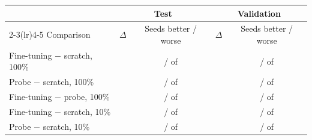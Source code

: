 \begin{tabular}{lcccc}
\toprule
 & \multicolumn{2}{c}{Test} & \multicolumn{2}{c}{Validation} \\
\cmidrule(lr){2-3}\cmidrule(lr){4-5}
Comparison & $\Delta$ & Seeds better / worse & $\Delta$ & Seeds better / worse \\
\midrule
Fine-tuning $-$ scratch, 100\% & \transferTestDiffMeanFinetuneVsScratchFOneZeroZero{} & \transferTestNBetterFinetuneVsScratchFOneZeroZero{} / \transferTestNWorseFinetuneVsScratchFOneZeroZero{} of \transferTestNComparedFinetuneVsScratchFOneZeroZero{} & \transferValDiffMeanFinetuneVsScratchFOneZeroZero{} & \transferValNBetterFinetuneVsScratchFOneZeroZero{} / \transferValNWorseFinetuneVsScratchFOneZeroZero{} of \transferValNComparedFinetuneVsScratchFOneZeroZero{} \\
Probe $-$ scratch, 100\% & \transferTestDiffMeanProbeVsScratchFOneZeroZero{} & \transferTestNBetterProbeVsScratchFOneZeroZero{} / \transferTestNWorseProbeVsScratchFOneZeroZero{} of \transferTestNComparedProbeVsScratchFOneZeroZero{} & \transferValDiffMeanProbeVsScratchFOneZeroZero{} & \transferValNBetterProbeVsScratchFOneZeroZero{} / \transferValNWorseProbeVsScratchFOneZeroZero{} of \transferValNComparedProbeVsScratchFOneZeroZero{} \\
Fine-tuning $-$ probe, 100\% & \transferTestDiffMeanFinetuneVsProbeFOneZeroZero{} & \transferTestNBetterFinetuneVsProbeFOneZeroZero{} / \transferTestNWorseFinetuneVsProbeFOneZeroZero{} of \transferTestNComparedFinetuneVsProbeFOneZeroZero{} & \transferValDiffMeanFinetuneVsProbeFOneZeroZero{} & \transferValNBetterFinetuneVsProbeFOneZeroZero{} / \transferValNWorseFinetuneVsProbeFOneZeroZero{} of \transferValNComparedFinetuneVsProbeFOneZeroZero{} \\
Fine-tuning $-$ scratch, 10\% & \transferTestDiffMeanFinetuneVsScratchFOneZero{} & \transferTestNBetterFinetuneVsScratchFOneZero{} / \transferTestNWorseFinetuneVsScratchFOneZero{} of \transferTestNComparedFinetuneVsScratchFOneZero{} & \transferValDiffMeanFinetuneVsScratchFOneZero{} & \transferValNBetterFinetuneVsScratchFOneZero{} / \transferValNWorseFinetuneVsScratchFOneZero{} of \transferValNComparedFinetuneVsScratchFOneZero{} \\
Probe $-$ scratch, 10\% & \transferTestDiffMeanProbeVsScratchFOneZero{} & \transferTestNBetterProbeVsScratchFOneZero{} / \transferTestNWorseProbeVsScratchFOneZero{} of \transferTestNComparedProbeVsScratchFOneZero{} & \transferValDiffMeanProbeVsScratchFOneZero{} & \transferValNBetterProbeVsScratchFOneZero{} / \transferValNWorseProbeVsScratchFOneZero{} of \transferValNComparedProbeVsScratchFOneZero{} \\

\end{tabular}
